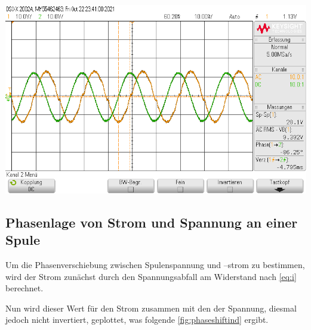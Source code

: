 \documentclass[11pt,ngerman]{scrartcl}
\begin{document}
\begin{center}
	\begin{minipage}[t]{0.7\textwidth}
		\includegraphics[width=\textwidth]{Phasenzeug/scope_22}
		\label{fig:phase_2}
	\end{minipage}
\end{center}

\newpage

\subsection{Phasenlage von Strom und Spannung an einer Spule}


Um die Phasenverschiebung zwischen Spulenspannung und –strom zu bestimmen, wird der Strom zunächst durch den Spannungsabfall am Widerstand nach \autoref{eq:i} berechnet.

\vspace{2mm}

Nun wird dieser Wert für den Strom zusammen mit den der Spannung, diesmal jedoch nicht invertiert, geplottet, was folgende \autoref{fig:phaseshiftind} ergibt.
\end{document}
